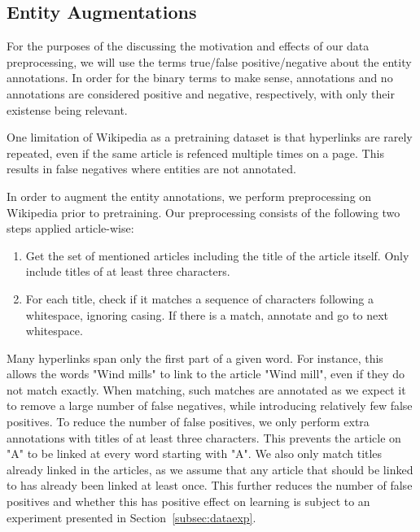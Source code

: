 \documentclass[main.tex]{subfiles}
\begin{document}
\subsection{Entity Augmentations}
\label{subsec:entaug}
For the purposes of the discussing the motivation and effects of our data preprocessing, we will use the terms true/false positive/negative about the entity annotations.
In order for the binary terms to make sense, annotations and no annotations are considered positive and negative, respectively, with only their existense being relevant.

One limitation of Wikipedia as a pretraining dataset is that hyperlinks are rarely repeated, even if the same article is refenced multiple times on a page.
This results in false negatives where entities are not annotated.

In order to augment the entity annotations, we perform preprocessing on Wikipedia prior to pretraining.
Our preprocessing consists of the following two steps applied article-wise:
\begin{enumerate}
    \item Get the set of mentioned articles including the title of the article itself.
    Only include titles of at least three characters.
    \item For each title, check if it matches a sequence of characters following a whitespace, ignoring casing.
    If there is a match, annotate and go to next whitespace.
\end{enumerate}
Many hyperlinks span only the first part of a given word.
For instance, this allows the words "Wind mills" to link to the article "Wind mill", even if they do not match exactly.
When matching, such matches are annotated as we expect it to remove a large number of false negatives, while introducing relatively few false positives.
To reduce the number of false positives, we only perform extra annotations with titles of at least three characters.
This prevents the article on "A" to be linked at every word starting with "A".
We also only match titles already linked in the articles, as we assume that any article that should be linked to has already been linked at least once.
This further reduces the number of false positives and whether this has positive effect on learning is subject to an experiment presented in Section~\ref{subsec:dataexp}.
\end{document}

